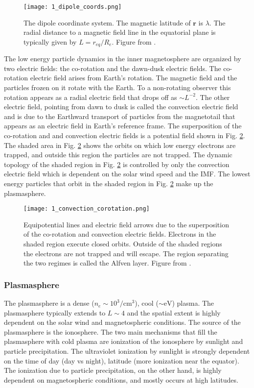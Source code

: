\begin{figure}
\texttt{[image: 1\_dipole\_coords.png]}
\caption{The dipole coordinate system. The magnetic latitude of $\mathbf{r}$ is $\lambda$. The radial distance to a magnetic field line in the equatorial plane is typically given by $L = r_{eq}/R_e$. Figure from \citet{Baumjohann1997}.}
\label{Intro:dipole_coords}
\end{figure}


The low energy particle dynamics in the inner magnetosphere are organized by two electric fields: the co-rotation and the dawn-dusk electric fields. The co-rotation electric field arises from Earth's rotation. The magnetic field and the particles frozen on it rotate with the Earth. To a non-rotating observer this rotation appears as a radial electric field that drops off as $\sim L^{-2}$. The other electric field, pointing from dawn to dusk is called the convection electric field and is due to the Earthward transport of particles from the magnetotail that appears as an electric field in Earth's reference frame. The superposition of the co-rotation and and convection electric fields is a potential field shown in Fig. \ref{Intro:E_fields}. The shaded area in Fig. \ref{Intro:E_fields} shows the orbits on which low energy electrons are trapped, and outside this region the particles are not trapped. The dynamic topology of the shaded region in Fig. \ref{Intro:E_fields} is controlled by only the convection electric field which is dependent on the solar wind speed and the IMF. The lowest energy particles that orbit in the shaded region in Fig. \ref{Intro:E_fields} make up the plasmasphere.

\begin{figure}
\texttt{[image: 1\_convection\_corotation.png]}
\caption{Equipotential lines and electric field arrows due to the superposition of the co-rotation and convection electric fields. Electrons in the shaded region execute closed orbits. Outside of the shaded regions the electrons are not trapped and will escape. The region separating the two regimes is called the Alfven layer. Figure from \citet{Baumjohann1997}.}
\label{Intro:E_fields}
\end{figure}

\subsubsection{Plasmasphere}
The plasmasphere is a dense ($n_e \sim 10^3/\mathrm{cm}^3$), cool ($\sim \mathrm{eV}$) plasma. The plasmasphere typically extends to $L \sim 4$ and the spatial extent is highly dependent on the solar wind and magnetospheric conditions. The source of the plasmasphere is the ionosphere. The two main mechanisms that fill the plasmasphere with cold plasma are ionization of the ionosphere by sunlight and particle precipitation. The ultraviolet ionization by sunlight is strongly dependent on the time of day (day vs night), latitude (more ionization near the equator). The ionization due to particle precipitation, on the other hand, is highly dependent on magnetospheric conditions, and mostly occurs at high latitudes.

